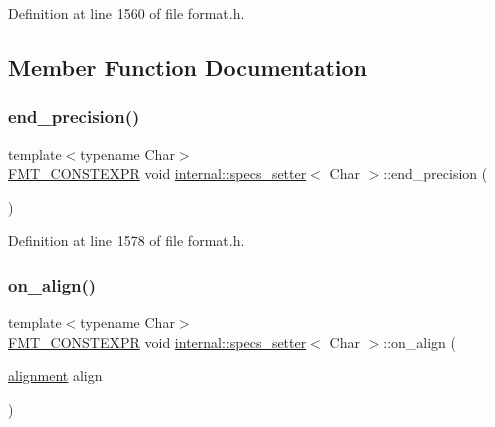 Definition at line 1560 of file format.\+h.



\subsection{Member Function Documentation}
\mbox{\label{classinternal_1_1specs__setter_a5d15aa0f82408448ef56bdba6f6e4394}} 
\subsubsection{\texorpdfstring{end\+\_\+precision()}{end\_precision()}}
{\footnotesize\ttfamily template$<$typename Char$>$ \\
\hyperlink{core_8h_a69201cb276383873487bf68b4ef8b4cd}{F\+M\+T\+\_\+\+C\+O\+N\+S\+T\+E\+X\+PR} void \hyperlink{classinternal_1_1specs__setter}{internal\+::specs\+\_\+setter}$<$ Char $>$\+::end\+\_\+precision (\begin{DoxyParamCaption}{ }\end{DoxyParamCaption})\hspace{0.3cm}{\ttfamily [inline]}}



Definition at line 1578 of file format.\+h.

\mbox{\label{classinternal_1_1specs__setter_a42211d2885e3317f39790553aedafdd3}} 
\subsubsection{\texorpdfstring{on\+\_\+align()}{on\_align()}}
{\footnotesize\ttfamily template$<$typename Char$>$ \\
\hyperlink{core_8h_a69201cb276383873487bf68b4ef8b4cd}{F\+M\+T\+\_\+\+C\+O\+N\+S\+T\+E\+X\+PR} void \hyperlink{classinternal_1_1specs__setter}{internal\+::specs\+\_\+setter}$<$ Char $>$\+::on\+\_\+align (\begin{DoxyParamCaption}\item[{\hyperlink{format_8h_a5460ac1c70db05be4ec2268f463ea981}{alignment}}]{align }\end{DoxyParamCaption})\hspace{0.3cm}{\ttfamily [inline]}}



